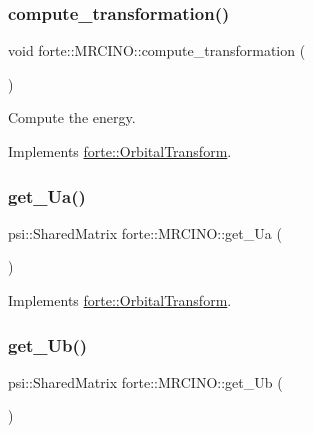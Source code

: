 \subsubsection{\texorpdfstring{compute\+\_\+transformation()}{compute\_transformation()}}
{\footnotesize\ttfamily void forte\+::\+M\+R\+C\+I\+N\+O\+::compute\+\_\+transformation (\begin{DoxyParamCaption}{ }\end{DoxyParamCaption})\hspace{0.3cm}{\ttfamily [virtual]}}



Compute the energy. 



Implements \mbox{\hyperlink{classforte_1_1_orbital_transform_a48704cbce9fd066ef7e58270bb413c25}{forte\+::\+Orbital\+Transform}}.

\mbox{\label{classforte_1_1_m_r_c_i_n_o_a75ca07096273157f61dc00db296944ee}} 
\subsubsection{\texorpdfstring{get\+\_\+\+Ua()}{get\_Ua()}}
{\footnotesize\ttfamily psi\+::\+Shared\+Matrix forte\+::\+M\+R\+C\+I\+N\+O\+::get\+\_\+\+Ua (\begin{DoxyParamCaption}{ }\end{DoxyParamCaption})\hspace{0.3cm}{\ttfamily [virtual]}}



Implements \mbox{\hyperlink{classforte_1_1_orbital_transform_aedd124480b35eba56653109578c05ec9}{forte\+::\+Orbital\+Transform}}.

\mbox{\label{classforte_1_1_m_r_c_i_n_o_a1a729beebcee99c34d9baa50af547d6e}} 
\subsubsection{\texorpdfstring{get\+\_\+\+Ub()}{get\_Ub()}}
{\footnotesize\ttfamily psi\+::\+Shared\+Matrix forte\+::\+M\+R\+C\+I\+N\+O\+::get\+\_\+\+Ub (\begin{DoxyParamCaption}{ }\end{DoxyParamCaption})\hspace{0.3cm}{\ttfamily [virtual]}}



